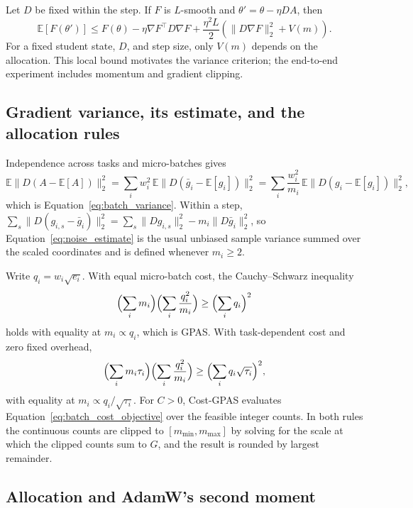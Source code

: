 Let $D$ be fixed within the step. If $F$ is $L$-smooth and
$\theta'=\theta-\eta DA$, then
\begin{equation}
    \mathbb E[F(\theta')]
    \leq F(\theta)-\eta\nabla F^\top D\nabla F
    +\frac{\eta^2L}{2}
      \left(\|D\nabla F\|_2^2+V(m)\right).
    \label{eq:one_step_descent}
\end{equation}
For a fixed student state, $D$, and step size, only $V(m)$ depends on the
allocation. This local bound motivates the variance criterion; the
end-to-end experiment includes momentum and gradient clipping.

\subsection{Gradient variance, its estimate, and the allocation rules}
\label{app:allocation_proofs}

Independence across tasks and micro-batches gives
\begin{equation}
\mathbb E\|D(A-\mathbb E[A])\|_2^2
=\sum_iw_i^2\,\mathbb E\|D(\bar g_i-\mathbb E[g_i])\|_2^2
=\sum_i\frac{w_i^2}{m_i}\,\mathbb E\|D(g_i-\mathbb E[g_i])\|_2^2,
\end{equation}
which is Equation~\ref{eq:batch_variance}. Within a step,
$\sum_s\|D(g_{i,s}-\bar g_i)\|_2^2=\sum_s\|Dg_{i,s}\|_2^2-m_i\|D\bar g_i\|_2^2$,
so Equation~\ref{eq:noise_estimate} is the usual unbiased sample variance
summed over the scaled coordinates and is defined whenever $m_i\geq2$.

Write $q_i=w_i\sqrt{e_i}$. With equal micro-batch cost, the Cauchy--Schwarz
inequality
\begin{equation}
\Bigl(\sum_i m_i\Bigr)\Bigl(\sum_i\frac{q_i^2}{m_i}\Bigr)
\geq\Bigl(\sum_i q_i\Bigr)^2
\end{equation}
holds with equality at $m_i\propto q_i$, which is GPAS. With task-dependent
cost and zero fixed overhead,
\begin{equation}
\Bigl(\sum_i m_i\tau_i\Bigr)\Bigl(\sum_i\frac{q_i^2}{m_i}\Bigr)
\geq\Bigl(\sum_i q_i\sqrt{\tau_i}\Bigr)^2,
\end{equation}
with equality at $m_i\propto q_i/\sqrt{\tau_i}$. For $C>0$, Cost-GPAS
evaluates Equation~\ref{eq:batch_cost_objective} over the feasible integer
counts. In both rules the continuous counts are clipped to
$[m_{\min},m_{\max}]$ by solving for the scale at which the clipped counts sum
to $G$, and the result is rounded by largest remainder.

\subsection{Allocation and AdamW's second moment}
\label{app:moment_target_proof}

